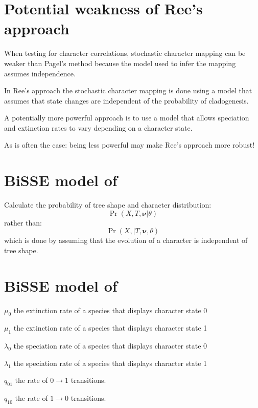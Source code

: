 \documentclass[landscape]{foils}
\begin{document}
\myNewSlide
\section*{Potential weakness of Ree's approach}
\large
\begin{compactitem}
	\item When testing for character correlations, stochastic character mapping can be weaker than Pagel's method because the model used to infer the mapping assumes independence.
	\item In Ree's approach the stochastic character mapping is done using a model that assumes that state changes are independent of the probability of cladogenesis.
	\item A potentially more powerful approach is to use a model that allows speciation and extinction rates to vary depending on a character state.
	\item As is often the case: being less powerful may make Ree's approach more robust!
\end{compactitem}


\myNewSlide
\section*{BiSSE model of \citet{MaddisonMO2007}}
Calculate the probability of tree shape and character distribution:
\[\Pr(X,T,{\bm \nu}|\theta)\]
rather than:
\[\Pr(X,|T,{\bm \nu}, \theta)\]
which is done by assuming that the evolution of a character is independent of tree shape.

\myNewSlide
\section*{BiSSE model of \citet{MaddisonMO2007}}
\begin{compactitem}
	\item[] $\mu_0$ the extinction rate of a species that displays character state 0
	\item[] $\mu_1$ the extinction rate of a species that displays character state 1
	\item[] $\lambda_0$ the speciation rate of a species that displays character state 0
	\item[] $\lambda_1$ the speciation rate of a species that displays character state 1
	\item[] $q_{01}$ the rate of $0\rightarrow 1 $ transitions.
	\item[] $q_{10}$ the rate of $1\rightarrow 0 $ transitions.
\end{compactitem}
\end{document}
